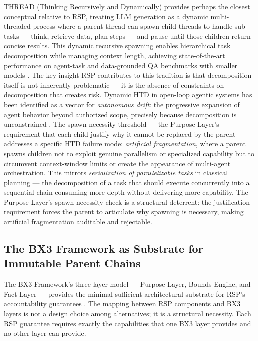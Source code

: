 THREAD (Thinking Recursively and Dynamically) provides perhaps the closest conceptual relative to RSP, treating LLM generation as a dynamic multi-threaded process where a parent thread can spawn child threads to handle sub-tasks --- think, retrieve data, plan steps --- and pause until those children return concise results. This dynamic recursive spawning enables hierarchical task decomposition while managing context length, achieving state-of-the-art performance on agent-task and data-grounded QA benchmarks with smaller models \cite{thread2025}. The key insight RSP contributes to this tradition is that decomposition itself is not inherently problematic --- it is the absence of constraints on decomposition that creates risk. Dynamic HTD in open-loop agentic systems has been identified as a vector for \emph{autonomous drift}: the progressive expansion of agent behavior beyond authorized scope, precisely because decomposition is unconstrained \cite{autoGPT2023}. The spawn necessity threshold --- the Purpose Layer's requirement that each child justify why it cannot be replaced by the parent --- addresses a specific HTD failure mode: \emph{artificial fragmentation}, where a parent spawns children not to exploit genuine parallelism or specialized capability but to circumvent context-window limits or create the appearance of multi-agent orchestration. This mirrors \emph{serialization of parallelizable tasks} in classical planning --- the decomposition of a task that should execute concurrently into a sequential chain consuming more depth without delivering more capability. The Purpose Layer's spawn necessity check is a structural deterrent: the justification requirement forces the parent to articulate why spawning is necessary, making artificial fragmentation auditable and rejectable.

\subsection{The BX3 Framework as Substrate for Immutable Parent Chains}

The BX3 Framework's three-layer model --- Purpose Layer, Bounds Engine, and Fact Layer --- provides the minimal sufficient architectural substrate for RSP's accountability guarantees \cite{bx3-framework}. The mapping between RSP components and BX3 layers is not a design choice among alternatives; it is a structural necessity. Each RSP guarantee requires exactly the capabilities that one BX3 layer provides and no other layer can provide.

